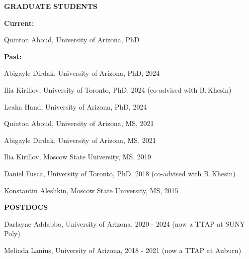 \documentclass[a4paper, 12pt]{article}
\begin{document}
\par\quad\par\smallskip
\textbf{GRADUATE STUDENTS} \par\smallskip
\textbf{Current:}
\begin{compactitem}
\item  Quinton Aboud, University of Arizona, PhD
\end{compactitem}
\par\smallskip
\textbf{Past:}
\begin{compactitem}
\item Abigayle Dirdak, University of Arizona, PhD, 2024
\item Ilia Kirillov, University of Toronto, PhD, 2024 (co-advised with B.\,Khesin)
\item  Leaha Hand, University of Arizona, PhD, 2024
\item  Quinton Aboud, University of Arizona, MS, 2021
\item Abigayle Dirdak, University of Arizona, MS, 2021
\item Ilia Kirillov, Moscow State University, MS, 2019
\item Daniel Fusca, University of Toronto, PhD, 2018 (co-advised with B.\,Khesin)
\item Konstantin Aleshkin, Moscow State University, MS, 2015



\end{compactitem}
\par\quad\par\smallskip
\textbf{POSTDOCS} \par\smallskip
\begin{compactitem}
\item Darlayne Addabbo, University of Arizona, 2020 - 2024 (now a TTAP at SUNY Poly)
\item Melinda Lanius, University of Arizona, 2018 - 2021 (now a TTAP at Auburn)
\end{compactitem}
\end{document}
